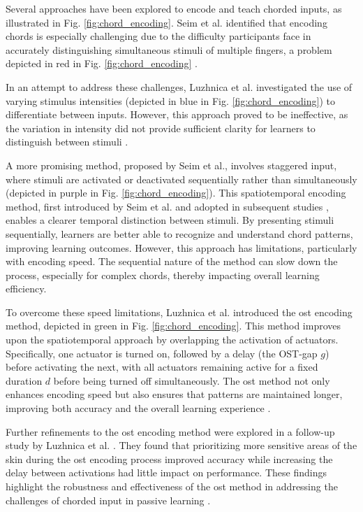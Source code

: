 Several approaches have been explored to encode and teach chorded inputs, as illustrated in Fig. \autoref{fig:chord_encoding}. Seim et al. identified that encoding chords is especially challenging due to the difficulty participants face in accurately distinguishing simultaneous stimuli of multiple fingers, a problem depicted in red in Fig. \autoref{fig:chord_encoding} \cite{Seim2014, Seim2015}. 

In an attempt to address these challenges, Luzhnica et al. investigated the use of varying stimulus intensities (depicted in blue in Fig. \autoref{fig:chord_encoding}) to differentiate between inputs. However, this approach proved to be ineffective, as the variation in intensity did not provide sufficient clarity for learners to distinguish between stimuli \cite{Luzhnica2017}.

A more promising method, proposed by Seim et al., involves staggered input, where stimuli are activated or deactivated sequentially rather than simultaneously (depicted in purple in Fig. \autoref{fig:chord_encoding}). This spatiotemporal encoding method, first introduced by Seim et al. \cite{Seim2014a} and adopted in subsequent studies \cite{Seim2014}, enables a clearer temporal distinction between stimuli. By presenting stimuli sequentially, learners are better able to recognize and understand chord patterns, improving learning outcomes. However, this approach has limitations, particularly with encoding speed. The sequential nature of the method can slow down the process, especially for complex chords, thereby impacting overall learning efficiency.

To overcome these speed limitations, Luzhnica et al. introduced the \gls{ost} encoding method, depicted in green in Fig. \autoref{fig:chord_encoding}. This method improves upon the spatiotemporal approach by overlapping the activation of actuators. Specifically, one actuator is turned on, followed by a delay (the OST-gap $g$) before activating the next, with all actuators remaining active for a fixed duration $d$ before being turned off simultaneously. The \gls{ost} method not only enhances encoding speed but also ensures that patterns are maintained longer, improving both accuracy and the overall learning experience \cite{Luzhnica2018, Luzhnica2018a, Luzhnica2017, Luzhnica2016}.

Further refinements to the \gls{ost} encoding method were explored in a follow-up study by Luzhnica et al. \cite{Luzhnica2017}. They found that prioritizing more sensitive areas of the skin during the \gls{ost} encoding process improved accuracy while increasing the delay between activations had little impact on performance. These findings highlight the robustness and effectiveness of the \gls{ost} method in addressing the challenges of chorded input in passive learning \cite{Luzhnica2017}.


